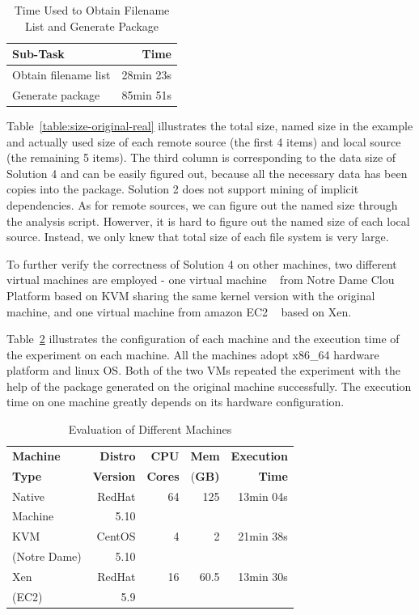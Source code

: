 \documentclass{sig-alternate}
\begin{document}
\begin{table}
    \centering
    \begin{tabular}{|l|r|}
    \hline
    \bf Sub-Task &\bf Time \\ \hline
    Obtain filename list & 28min 23s \\ \hline
    Generate package & 85min 51s \\ \hline
    \end{tabular}
    \caption{Time Used to Obtain Filename List and Generate Package}
    \label{table:time-3rd}
\end{table}

Table~\ref{table:size-original-real} illustrates the total size, named size in the example and actually used size of each remote source (the first 4 items) and local source (the remaining 5 items).
The third column is corresponding to the data size of Solution 4 and can be easily figured out, because all the necessary data has been copies into the package.
Solution 2 does not support mining of implicit dependencies. As for remote sources, we can figure out the named size through the analysis script. Howerver, it is hard to figure out the named size of each local source. 
Instead, we only knew that total size of each file system is very large.

To further verify the correctness of Solution 4 on other machines, two different virtual machines are employed -
one virtual
machine ~\cite{goldberg1974survey} from Notre Dame Clou Platform based on KVM sharing the same kernel version with the original machine,
and one virtual machine from amazon EC2 ~\cite{amazon2010amazon} based on Xen.

Table~\ref{table:config-vm} illustrates the configuration of 
each machine and the execution time of the experiment on each machine.
All the machines adopt x86\_64 hardware platform and linux OS.
Both of the two VMs repeated the experiment with the help of the package generated on the original machine successfully.
The execution time on one machine greatly depends on its hardware configuration.

\begin{table}
    \centering
    \begin{tabular}{|l|r|r|r|r|}
    \hline
    \bf Machine & \bf Distro & \bf CPU & \bf Mem & \bf Execution\\ 
    \bf Type   &\bf Version&\bf Cores & (\bf GB) & \bf Time\\ \hline
    Native &  RedHat  & 64 & 125 & 13min 04s\\  
    Machine& 5.10 &&&\\ \hline
    KVM & CentOS & 4 & 2 & 21min 38s\\
    (Notre Dame)&5.10 &&&\\ \hline
    Xen & RedHat & 16 & 60.5 & 13min 30s\\ 
    (EC2) &5.9 &&&\\ \hline
    \end{tabular}
    \caption{Evaluation of Different Machines}
    \label{table:config-vm}
\end{table}
\end{document}
